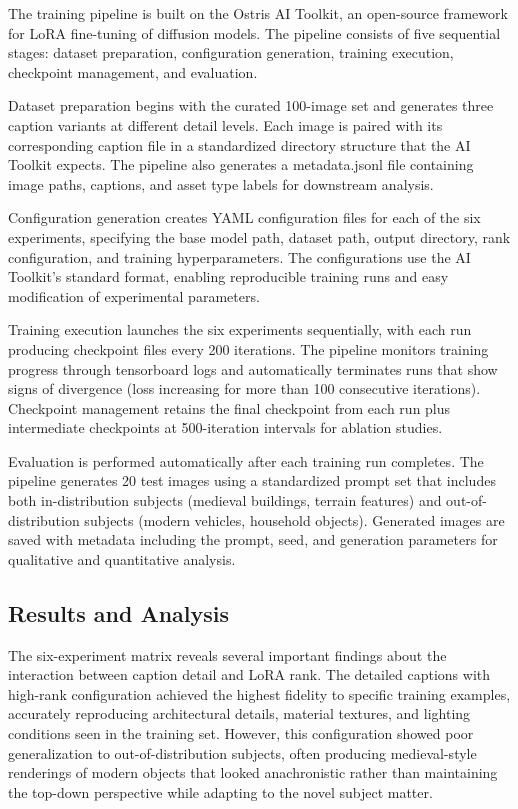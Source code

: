\documentclass[conference]{IEEEtran}
\begin{document}
The training pipeline is built on the Ostris AI Toolkit, an open-source framework for LoRA fine-tuning of diffusion models. The pipeline consists of five sequential stages: dataset preparation, configuration generation, training execution, checkpoint management, and evaluation.

Dataset preparation begins with the curated 100-image set and generates three caption variants at different detail levels. Each image is paired with its corresponding caption file in a standardized directory structure that the AI Toolkit expects. The pipeline also generates a metadata.jsonl file containing image paths, captions, and asset type labels for downstream analysis.

Configuration generation creates YAML configuration files for each of the six experiments, specifying the base model path, dataset path, output directory, rank configuration, and training hyperparameters. The configurations use the AI Toolkit's standard format, enabling reproducible training runs and easy modification of experimental parameters.

Training execution launches the six experiments sequentially, with each run producing checkpoint files every 200 iterations. The pipeline monitors training progress through tensorboard logs and automatically terminates runs that show signs of divergence (loss increasing for more than 100 consecutive iterations). Checkpoint management retains the final checkpoint from each run plus intermediate checkpoints at 500-iteration intervals for ablation studies.

Evaluation is performed automatically after each training run completes. The pipeline generates 20 test images using a standardized prompt set that includes both in-distribution subjects (medieval buildings, terrain features) and out-of-distribution subjects (modern vehicles, household objects). Generated images are saved with metadata including the prompt, seed, and generation parameters for qualitative and quantitative analysis.

\subsection{Results and Analysis}

The six-experiment matrix reveals several important findings about the interaction between caption detail and LoRA rank. The detailed captions with high-rank configuration achieved the highest fidelity to specific training examples, accurately reproducing architectural details, material textures, and lighting conditions seen in the training set. However, this configuration showed poor generalization to out-of-distribution subjects, often producing medieval-style renderings of modern objects that looked anachronistic rather than maintaining the top-down perspective while adapting to the novel subject matter.
\end{document}
